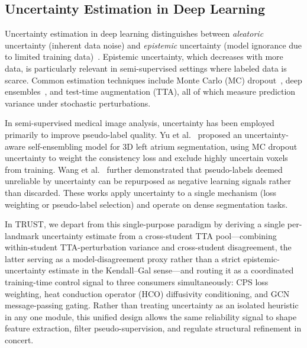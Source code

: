 \documentclass[conference]{IEEEtran}
\begin{document}
\subsection{Uncertainty Estimation in Deep Learning}

Uncertainty estimation in deep learning distinguishes between \emph{aleatoric} uncertainty (inherent data noise) and \emph{epistemic} uncertainty (model ignorance due to limited training data)~\cite{Kendall2017_uncertainty}. Epistemic uncertainty, which decreases with more data, is particularly relevant in semi-supervised settings where labeled data is scarce. Common estimation techniques include Monte Carlo (MC) dropout~\cite{Gal2016_dropout_uncertainty}, deep ensembles~\cite{Lakshminarayanan2017_deep_ensembles}, and test-time augmentation (TTA), all of which measure prediction variance under stochastic perturbations.

In semi-supervised medical image analysis, uncertainty has been employed primarily to improve pseudo-label quality. Yu et al.~\cite{Yu2019_uncertainty_aware} proposed an uncertainty-aware self-ensembling model for 3D left atrium segmentation, using MC dropout uncertainty to weight the consistency loss and exclude highly uncertain voxels from training. Wang et al.~\cite{Wang2022_u2pl} further demonstrated that pseudo-labels deemed unreliable by uncertainty can be repurposed as negative learning signals rather than discarded. These works apply uncertainty to a single mechanism (loss weighting or pseudo-label selection) and operate on dense segmentation tasks.

In TRUST, we depart from this single-purpose paradigm by deriving a single per-landmark uncertainty estimate from a cross-student TTA pool---combining within-student TTA-perturbation variance and cross-student disagreement, the latter serving as a model-disagreement proxy rather than a strict epistemic-uncertainty estimate in the Kendall--Gal sense---and routing it as a coordinated training-time control signal to three consumers simultaneously: CPS loss weighting, heat conduction operator (HCO) diffusivity conditioning, and GCN message-passing gating. Rather than treating uncertainty as an isolated heuristic in any one module, this unified design allows the same reliability signal to shape feature extraction, filter pseudo-supervision, and regulate structural refinement in concert.
\end{document}
